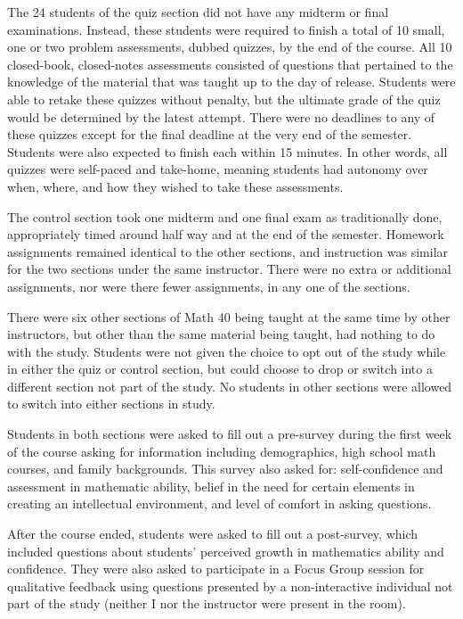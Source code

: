 The 24 students of the quiz section did not have any midterm or final examinations. Instead, these students were required to finish a total of 10 small, one or two problem assessments, dubbed quizzes, by the end of the course. All 10 closed-book, closed-notes assessments consisted of questions that pertained to the knowledge of the material that was taught up to the day of release. Students were able to retake these quizzes without penalty, but the ultimate grade of the quiz would be determined by the latest attempt. There were no deadlines to any of these quizzes except for the final deadline at the very end of the semester. Students were also expected to finish each within 15 minutes. In other words, all quizzes were self-paced and take-home, meaning students had autonomy over when, where, and how they wished to take these assessments.

The control section took one midterm and one final exam as traditionally done, appropriately timed around half way and at the end of the semester. Homework assignments remained identical to the other sections, and instruction was similar for the two sections under the same instructor. There were no extra or additional assignments, nor were there fewer assignments, in any one of the sections.

There were six other sections of Math 40 being taught at the same time by other instructors, but other than the same material being taught, had nothing to do with the study. Students were not given the choice to opt out of the study while in either the quiz or control section, but could choose to drop or switch into a different section not part of the study. No students in other sections were allowed to switch into either sections in study.

Students in both sections were asked to fill out a pre-survey during the first week of the course asking for information including demographics, high school math courses, and family backgrounds. This survey also asked for: self-confidence and assessment in mathematic ability, belief in the need for certain elements in creating an intellectual environment, and level of comfort in asking questions.

After the course ended, students were asked to fill out a post-survey, which included questions about students' perceived growth in mathematics ability and confidence. They were also asked to participate in a Focus Group session for qualitative feedback using questions presented by a non-interactive individual not part of the study (neither I nor the instructor were present in the room).


